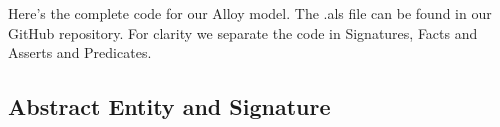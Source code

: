Here’s the complete code for our Alloy model. The .als file can be found in our
GitHub repository. For clarity we separate the code in Signatures, Facts and
Asserts and Predicates.

\subsection{Abstract Entity and Signature}


